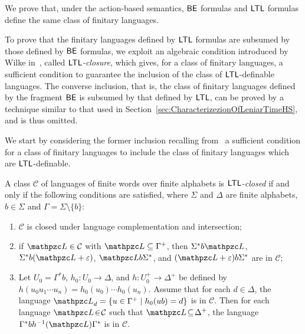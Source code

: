 We prove that, under the action-based semantics, $\mathsf{BE}$ formulas and $\text{\sffamily LTL}$ formulas define the same class of finitary languages.

To prove that the finitary languages defined by $\text{\sffamily LTL}$ formulas are subsumed by 
those defined by $\mathsf{BE}$ formulas, we exploit an algebraic condition introduced by Wilke in~\cite{stacs/Wilke99}, called \emph{$\text{\sffamily LTL}$-closure}, which gives, for a class of finitary languages, a sufficient condition to guarantee the inclusion of the class of $\text{\sffamily LTL}$-definable languages.
%
The converse inclusion, that is, the class of finitary languages defined by the fragment $\mathsf{BE}$ is subsumed by that defined by $\text{\sffamily LTL}$, can be proved by a technique similar to that used in Section~\ref{sec:CharacterizezionOfLeniarTimeHS}, and is thus omitted.

We start by considering the former inclusion recalling from~\cite{stacs/Wilke99} a sufficient condition for a class of finitary languages to include the class of finitary languages which are $\text{\sffamily LTL}$-definable.


  \begin{definition}\label{def:LTLClosure} A class $\mathcal{C}$  of languages of finite words over finite alphabets is \emph{$\text{\sffamily LTL}$-closed} if and only if the following conditions are satisfied, where $\Sigma$ and $\Delta$ are finite alphabets, $b\in \Sigma$ and $\Gamma=\Sigma\setminus\{b\}$:
  \begin{enumerate}
    \item $\mathcal{C}$ is closed under language complementation and intersection;
    \item if $\Lang \in \mathcal{C}$ with $\Lang\subseteq \Gamma^{+}$, then  $\Sigma^* b\Lang$, $\Sigma^* b(\Lang+\varepsilon)$,
    $ \Lang b \Sigma^* $, and $ (\Lang+\varepsilon) b \Sigma^* $ are in  $\mathcal{C}$;
    \item Let $U_0= \Gamma^{*}b$, $h_0:U_0 \rightarrow \Delta$, and $h:U_0^{+} \rightarrow \Delta^{+}$ be defined by
    $h(u_0u_1\cdots u_n)=h_0(u_0)\cdots h_0(u_n)$. Assume that for each $d\in \Delta$, the language $\Lang_d =\{u\in \Gamma^{+}\mid h_0(ub)= d\}$
    is in $\mathcal{C}$. Then for each language $\Lang\!\in\! \mathcal{C}$ such that $\Lang\!\subseteq\! \Delta^{+}$,
    the language $\Gamma^{*}b h^{-1}(\Lang)\Gamma^{*}$ is in $\mathcal{C}$.
  \end{enumerate}
  \end{definition}
  
